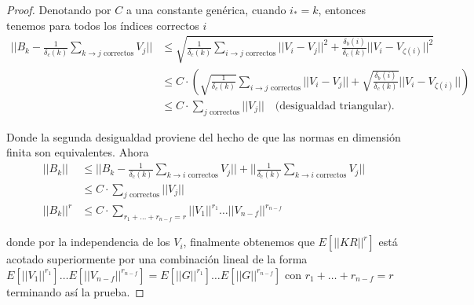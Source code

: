 \begin{proof}
	Denotando por $C$ a una constante genérica, cuando $i_*=k$, entonces tenemos para todos los índices correctos $i$
	\begin{equation}\begin{split}
			||B_k - \frac{1}{\delta_c(k)}\sum_{k \to j \text{ correctos}} V_j|| & \le \sqrt{\frac{1}{\delta_c(k)} \sum_{i \to j \text{ correctos}} ||V_i - V_j||^2 + \frac{\delta_b(i)}{\delta_c(k)}||V_i - V_{\zeta(i)}||^2} \\
			& \le C \cdot \left(  \sqrt{\frac{1}{\delta_c(k)}} \sum_{i \to j \text{ correctos}} ||V_i - V_j|| + \sqrt{\frac{\delta_b(i)}{\delta_c(k)}} ||V_i - V_{\zeta(i)}|| \right) \\
			& \le C \cdot \sum_{j \text{ correctos}}||V_j||\quad \text{(desigualdad triangular)}.
	\end{split}\end{equation}
	
	Donde la segunda desigualdad proviene del hecho de que las normas en dimensión finita son equivalentes. Ahora
	\begin{equation}\begin{split}
			||B_k|| & \le || B_k - \frac{1}{\delta_c(k)}\sum_{k \to i \text{ correctos}} V_j ||+ ||\frac{1}{\delta_c(k) }\sum_{k \to i \text{ correctos}} V_j|| \\
			& \le C \cdot \sum_{j \text{ correctos}}||V_j|| \\
			||B_k||^r & \le C \cdot \sum_{r_1 + \ldots + r_{n-f}=r}||V_1||^{r_1} \ldots ||V_{n-f}||^{r_{n-f}}
	\end{split}\end{equation}
	
	donde por la independencia de los $V_i$, finalmente obtenemos que $E[||KR||^r]$ está acotado superiormente por una combinación lineal de la forma $E[||V_1||^{r_1}]\ldots E[||V_{n-f}||^{r_{n-f}}]=E[||G||^{r_1}]\ldots E[||G||^{r_{n-f}}]$ con $r_1 + \ldots + r_{n-f}=r$ terminando así la prueba.
\end{proof}